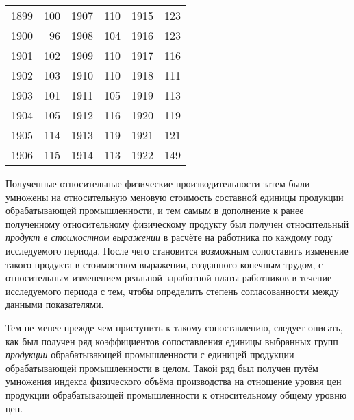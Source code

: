 \documentclass[leqno]{article}  %
\begin{document}
\begin{table}[!h]
\centering
\footnotesize{
\begin{tabular}{r@{~\ldots~}rr@{~\ldots~}lr@{~\ldots~}l}
1899 & 100 & 1907 & 110 & 1915 & 123 \\
1900 & 96 & 1908 & 104 & 1916 & 123 \\
1901 & 102 & 1909 & 110 & 1917 & 116 \\
1902 & 103 & 1910 & 110 & 1918 & 111 \\
1903 & 101 & 1911 & 105 & 1919 & 113 \\
1904 & 105 & 1912 & 116 & 1920 & 119 \\
1905 & 114 & 1913 & 119 & 1921 & 121 \\
1906 & 115 & 1914 & 113 & 1922 & 149
\end{tabular}
}
\end{table}


\par
Полученные относительные физические производительности затем были умножены на относительную меновую стоимость составной единицы продукции обрабатывающей промышленности, и тем самым в дополнение к ранее полученному относительному физическому продукту был получен относительный \emph{продукт в стоимостном выражении} в расчёте на работника по каждому году исследуемого периода. После чего становится возможным сопоставить изменение такого продукта в стоимостном выражении, созданного конечным трудом, с относительным изменением реальной заработной платы работников в течение исследуемого периода с тем, чтобы определить степень согласованности между данными показателями.
\par
Тем не менее прежде чем приступить к такому сопоставлению, следует описать, как был получен ряд коэффициентов сопоставления единицы выбранных групп \emph{продукции} обрабатывающей промышленности с единицей продукции обрабатывающей промышленности в целом. Такой ряд был получен путём умножения индекса физического объёма производства на отношение уровня цен продукции обрабатывающей промышленности к относительному общему уровню цен.
\end{document}
